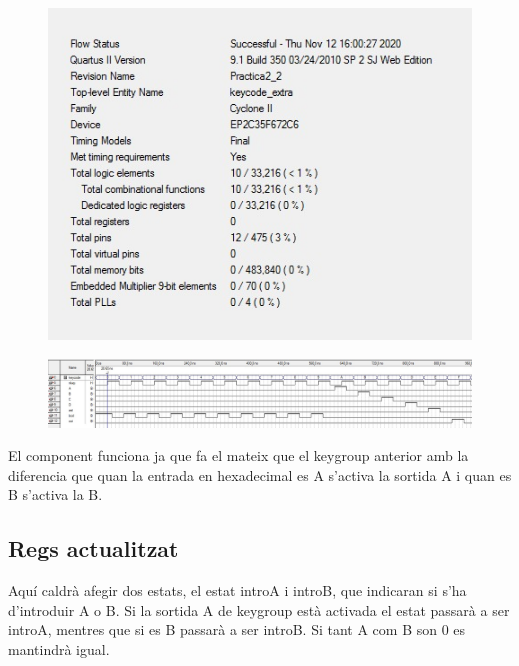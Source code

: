 \documentclass[12pt, a4papre]{article}
\begin{document}
\begin{figure}[H]
		\begin{center}
		\includegraphics[width=130mm]{informekeygroupextra.jpeg}
		\end{center}
	\end{figure}

	\begin{figure}[H]
		\begin{center}
		\includegraphics[width=130mm]{SimKCex.jpeg}
		\end{center}
	\end{figure}

	
	
	El component funciona ja que fa el mateix que el keygroup anterior amb la diferencia que quan la entrada en hexadecimal es A s'activa la sortida A i quan es B s'activa la B.
	
	\subsection{Regs actualitzat}
	
	Aquí caldrà afegir dos estats, el estat introA i introB, que indicaran si s'ha d'introduir A o B. Si la sortida A de keygroup està activada el estat passarà a ser introA, mentres que si es B passarà a ser introB. Si tant A com B son 0 es mantindrà igual. 
	
\end{document}
